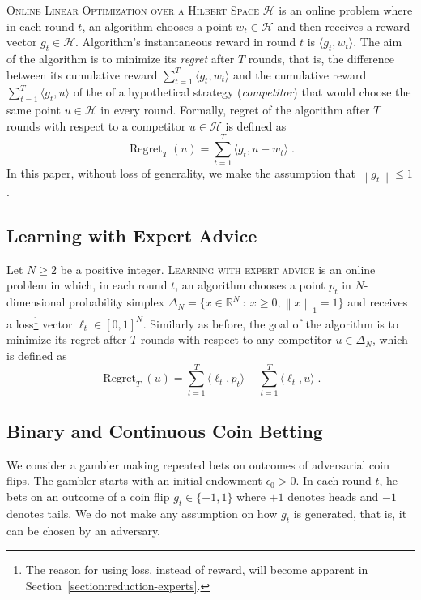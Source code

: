 \documentclass{colt2016_empty} %
\DeclareMathOperator{\Regret}{Regret}
\newcommand{\R}{\mathbb{R}}     %
\renewcommand{\H}{\mathcal{H}}  %
\newcommand{\norm}[1]{\left\|{#1}\right\|}
\begin{document}
\textsc{Online Linear Optimization over a Hilbert Space $\H$} is an online
problem where in each round $t$, an algorithm chooses a point $w_t \in \H$ and
then receives a reward vector $g_t \in \H$. Algorithm's instantaneous reward in
round $t$ is $\langle g_t, w_t \rangle$. The aim of the algorithm is to minimize
its \emph{regret} after $T$ rounds, that is, the difference between its
cumulative reward $\sum_{t=1}^T \langle g_t, w_t \rangle$ and the cumulative
reward $\sum_{t=1}^T \langle g_t, u \rangle$ of the of a hypothetical strategy
(\emph{competitor}) that would choose the same point $u \in \H$ in every round.
Formally, regret of the algorithm after $T$ rounds with respect to a competitor
$u \in \H$ is defined as
\begin{equation}
\label{equation:regret-definition}
\Regret_T(u) = \sum_{t=1}^T \langle g_t , u - w_t \rangle \; .
\end{equation}
In this paper, without loss of generality, we make the assumption that $\norm{g_t} \le 1$.


\subsection{Learning with Expert Advice}

Let $N \ge 2$ be a positive integer. \textsc{Learning with expert advice} is an
online problem in which, in each round $t$, an algorithm chooses a point $p_t$
in $N$-dimensional probability simplex $\Delta_N = \{ x \in \R^N ~:~ x \ge 0,
\norm{x}_1 = 1 \}$ and receives a loss\footnote{The reason for using loss,
instead of reward, will become apparent in
Section~\ref{section:reduction-experts}.} vector $\ell_t \in [0,1]^N$. Similarly
as before, the goal of the algorithm is to minimize its regret after $T$ rounds
with respect to any competitor $u \in \Delta_N$, which is defined as
$$
\Regret_T(u) = \sum_{t=1}^T \langle \ell_t, p_t \rangle - \sum_{t=1}^T \langle \ell_t, u \rangle \; .
$$

\subsection{Binary and Continuous Coin Betting}

We consider a gambler making repeated bets on outcomes of adversarial coin
flips. The gambler starts with an initial endowment $\epsilon_0 > 0$. In each
round $t$, he bets on an outcome of a coin flip $g_t \in \{-1,1\}$ where $+1$
denotes heads and $-1$ denotes tails. We do not make any assumption on how $g_t$
is generated, that is, it can be chosen by an adversary.
\end{document}
